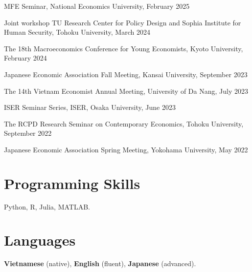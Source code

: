 \documentclass[12pt]{article}
\begin{document}
\begin{enumerate}[label={[\arabic*]}]
\item MFE Seminar, National Economics University, February 2025
\item Joint workshop TU Research Center for Policy Design and Sophia Institute for Human Security, Tohoku University, March 2024
\item The 18th Macroeconomics Conference for Young Economists, Kyoto University, February 2024
\item Japanese Economic Association Fall Meeting, Kansai University, September 2023
\item The 14th Vietnam Economist Annual Meeting, University of Da Nang, July 2023
\item ISER Seminar Series, ISER, Osaka University, June 2023
\item The RCPD Research Seminar on Contemporary Economics, Tohoku University, September 2022
\item Japanese Economic Association Spring Meeting, Yokohama University, May 2022
\end{enumerate}

%
%
%
%

\section{Programming Skills}

Python, R, Julia, MATLAB.

\section{Languages}

\textbf{Vietnamese} (native), \textbf{English} (fluent), \textbf{Japanese} (advanced).
\end{document}
